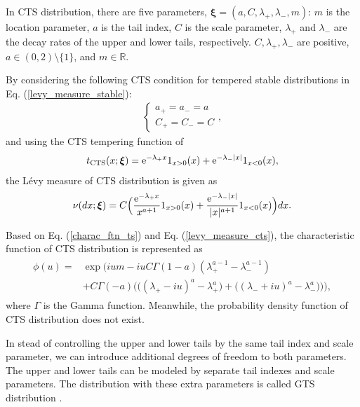 \documentclass[preprint,11pt]{amsart}
\begin{document}
	 In CTS distribution, there are five parameters, $\boldsymbol{\xi}=(a, C,\lambda_+,\lambda_-,m)$: $m$ is the location parameter, $a$ is the tail index, $C$ is the scale parameter, $\lambda_+$ and $\lambda_-$ are the decay rates of the upper and lower tails, respectively. $C, \lambda_+, \lambda_-$ are positive, $a\in(0,2)\setminus \{1\}$, and $m\in\mathbb{R}$.
	 
	By considering the following CTS condition for tempered stable distributions in Eq. (\ref{levy_measure_stable}):
	\begin{align}
	\label{cts_condition}
		\left\{ 
		\begin{array}{ll}
			a_+=a_-=a\\
			C_+=C_-=C
		\end{array}
		\right.,
	\end{align}
	and using the CTS tempering function of
	\begin{align}
	\label{temp_fns_cts}
	 	t_{\textrm{CTS}}(x;\boldsymbol{\xi})={\rm e}^{-\lambda_{+}x} 1_{x>0}(x)+{\rm e}^{-\lambda_{-} |x|} 1_{x<0}(x),
	\end{align}
	the L\'evy measure of CTS distribution \cite{rachev2011financial} is given as
	\begin{align}
	\label{levy_measure_cts}
		\nu(dx;\boldsymbol{\xi})=C\Big(\frac{{\rm e}^{-\lambda_{+}x}}{x^{a+1}} 1_{x>0}(x)+\frac{{\rm e}^{-\lambda_{-} |x|}}{|x|^{a+1}} 1_{x<0}(x)\Big)dx.
	\end{align}
	
	Based on Eq. (\ref{charac_ftn_ts}) and Eq. (\ref{levy_measure_cts}), the characteristic function of CTS distribution is represented as
	\begin{align}
	\label{charac_ftn_cts}
	\begin{split}
		\phi(u)=&\exp\Big(ium-iuC\Gamma(1-a)(\lambda_+^{a-1}-\lambda_-^{a-1})\\
		&+C\Gamma(-a)\big(\big((\lambda_+-iu)^a-\lambda_+^a\big)+\big((\lambda_-+iu)^a-\lambda_-^a\big)\big)\Big),
	\end{split}
	\end{align}
	where $\Gamma$ is the Gamma function. Meanwhile, the probability density function of CTS distribution does not exist.
		
	In stead of controlling the upper and lower tails by the same tail index and scale parameter, we can introduce additional degrees of freedom to both parameters. The upper and lower tails can be modeled by separate tail indexes and scale parameters. The distribution with these extra parameters is called GTS distribution \cite{rachev2011financial}. 
	
\end{document}
